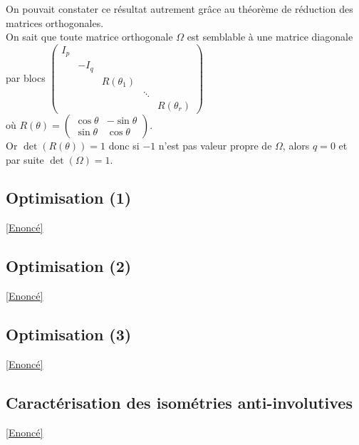 \documentclass[8pt]{book}
\begin{document}
\begin{enumerate}[leftmargin=*]
		On pouvait constater ce résultat autrement grâce au théorème de réduction des matrices orthogonales.\\
		On sait que toute matrice orthogonale $\Omega$ est semblable à une matrice diagonale par blocs $\begin{pmatrix}
			I_p&&&&\\
			&-I_q&&\\
			&&R(\theta_1)&\\
			&&&\ddots&\\
			&&&&R(\theta_r)
		\end{pmatrix}$\\
		où $R(\theta)=\begin{pmatrix}\cos\theta&-\sin\theta\\\sin\theta&\cos\theta\end{pmatrix}$.\\
		Or $\det(R(\theta))=1$ donc si $-1$ n'est pas valeur propre de $\Omega$, alors $q=0$ et par suite $\det(\Omega)=1$.
	\end{enumerate}
	
	\subsection{Optimisation (1)}
	\label{Optimisation 1 corrigé}
	\textcolor{blue}{\hyperref[Optimisation 1]{[Enoncé]}}\\
	
	\subsection{Optimisation (2)}
	\label{Optimisation 2 corrigé}
	\textcolor{blue}{\hyperref[Optimisation 2]{[Enoncé]}}\\
	
	\subsection{Optimisation (3)}
	\label{Optimisation 3 corrigé}
	\textcolor{blue}{\hyperref[Optimisation 3]{[Enoncé]}}\\
	
	\subsection{Caractérisation des isométries anti-involutives}
	\label{Caractérisation des isométries anti-involutives corrigé}
	\textcolor{blue}{\hyperref[Caractérisation des isométries anti-involutives]{[Enoncé]}}\\
	
\end{document}
